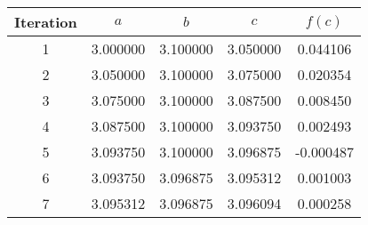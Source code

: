 \begin{tabular}{|c|c|c|c|c|}
\hline
Iteration & $a$ & $b$ & $c$ & $f(c)$ \\
\hline
1 & 3.000000 & 3.100000 & 3.050000 & 0.044106 \\
\hline
2 & 3.050000 & 3.100000 & 3.075000 & 0.020354 \\
\hline
3 & 3.075000 & 3.100000 & 3.087500 & 0.008450 \\
\hline
4 & 3.087500 & 3.100000 & 3.093750 & 0.002493 \\
\hline
5 & 3.093750 & 3.100000 & 3.096875 & -0.000487 \\
\hline
6 & 3.093750 & 3.096875 & 3.095312 & 0.001003 \\
\hline
7 & 3.095312 & 3.096875 & 3.096094 & 0.000258 \\
\hline
\end{tabular}